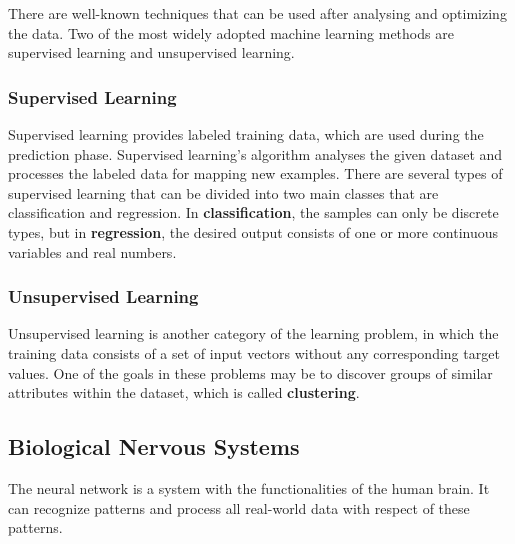 There are well-known techniques that can be used after analysing and optimizing the data. Two of the most widely adopted machine learning methods are supervised learning and unsupervised learning.

\subsubsection{Supervised Learning}

\label{para:supervised}Supervised learning provides labeled training data, which are used during the prediction phase. Supervised learning's algorithm analyses the given dataset and processes the labeled data for mapping new examples. There are several types of supervised learning that can be divided into two main classes that are classification and regression. In \textbf{classification}, the samples can only be discrete types, but in \textbf{regression}, the desired output consists of one or more continuous variables and real numbers.

\subsubsection{Unsupervised Learning}

Unsupervised learning is another category of the learning problem, in which the training data consists of a set of input vectors without any corresponding target values. One of the goals in these problems may be to discover groups of similar attributes within the dataset, which is called \textbf{clustering}.



\subsection{Biological Nervous Systems}

The neural network \cite{feldman2013neural} is a system with the functionalities of the human brain. It can recognize patterns and process all real-world data with respect of these patterns.\smallskip

